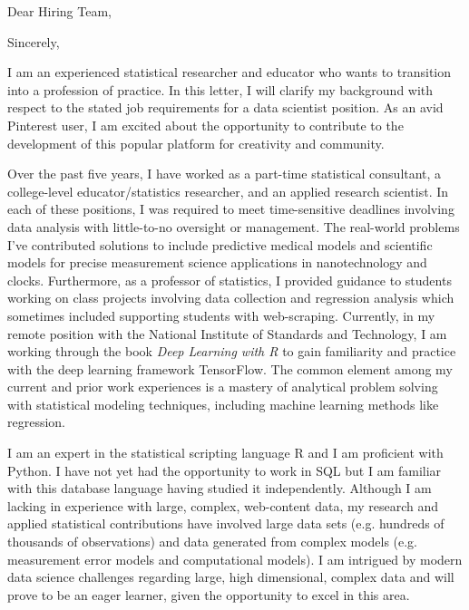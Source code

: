 \documentclass[11pt,a4paper,sans]{moderncv}
\begin{document}
	
	{}
	\date{\today }
	\opening{Dear Hiring Team,}
	\closing{Sincerely,}
	\makelettertitle
	
	I am an experienced statistical researcher and educator who wants to transition into a profession of practice. In this letter, I will clarify my background with respect to the stated job requirements for a data scientist position. As an avid Pinterest user, I am excited about the opportunity to contribute to the development of this popular platform for creativity and community. 
	
	Over the past five years, I have worked as a part-time statistical consultant, a college-level educator/statistics researcher, and an applied research scientist. In each of these positions, I was required to meet time-sensitive deadlines involving data analysis with little-to-no oversight or management. The real-world problems I've contributed solutions to include predictive medical models and scientific models for precise measurement science applications in nanotechnology and clocks. Furthermore, as a professor of statistics, I provided guidance to students working on class projects involving data collection and regression analysis which sometimes included supporting students with web-scraping. Currently, in my remote position with the National Institute of Standards and Technology, I am working through the book {\em Deep Learning with R} to gain familiarity and practice with the deep learning framework TensorFlow. The common element among my current and prior work experiences is a mastery of analytical problem solving with statistical modeling techniques, including machine learning methods like regression. 
	 
	I am an expert in the statistical scripting language R and I am proficient with Python. I have not yet had the opportunity to work in SQL but I am familiar with this database language having studied it independently. Although I am lacking in experience with large, complex, web-content data, my research and applied statistical contributions have involved large data sets (e.g. hundreds of thousands of observations) and data generated from complex models (e.g. measurement error models and computational models). I am intrigued by modern data science challenges regarding large, high dimensional, complex data and will prove to be an eager learner, given the opportunity to excel in this area. 
	
\end{document}
